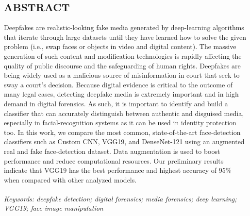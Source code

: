\begin{center}
    
    
    \section*{ABSTRACT}
    \justify
    Deepfakes are realistic-looking fake media generated by deep-learning algorithms that iterate through large datasets until
    they have learned how to solve the given problem (i.e., swap faces or objects in video and digital content). The massive generation
    of such content and modification technologies is rapidly affecting the quality of public discourse and the safeguarding of
    human rights. Deepfakes are being widely used as a malicious source of misinformation in court that seek to sway a court’s decision.
    Because digital evidence is critical to the outcome of many legal cases, detecting deepfake media is extremely important and in high demand in digital forensics.
    As such, it is important to identify and build a classifier that can accurately distinguish between authentic and disguised media, especially in facial-recognition systems
    as it can be used in identity protection too. In this work, we compare the most common, state-of-the-art face-detection classifiers such as Custom CNN, VGG19, and DenseNet-121
    using an augmented real and fake face-detection dataset. Data augmentation is used to boost performance and reduce computational resources. Our preliminary results indicate that VGG19 has the best performance
    and highest accuracy of 95\% when compared with other analyzed models.\\
    \vspace{3 in}
    \\ \textit{Keywords: deepfake detection; digital forensics; media forensics; deep learning; VGG19; face-image manipulation}
    
    
\end{center}